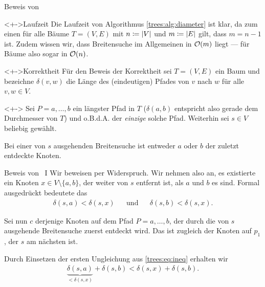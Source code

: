 \begin{frame}{Beweis von }
\begin{block}<+->{Laufzeit}
Die Laufzeit von Algorithmus \ref{trees:alg:diameter} ist klar, da zum einen f\"ur alle B\"aume $T = (V, E)$ mit $n \coloneqq \vert V\vert$ und $m \coloneqq \vert E\vert$ gilt, dass $m = n - 1$ ist.
Zudem wissen wir, dass Breitensuche im Allgemeinen in $\mathcal{O}(m)$ liegt --- f\"ur B\"aume also sogar in $\mathcal{O}(n)$.
\end{block}

\begin{block}<+->{Korrektheit}
F\"ur den Beweis der Korrektheit sei $T = (V, E)$ ein Baum und bezeichne $\delta(v, w)$ die L\"ange des (eindeutigen) Pfades von $v$ nach $w$ f\"ur alle $v, w \in V$.

\begin{lemma}<+->
\label{trees:lem:dist}
\vspace*{-7pt}
Sei $P = a, \dots, b$ ein l\"angster Pfad in $T$ ($\delta(a, b)$ entspricht also gerade dem Durchmesser von $T$) und o.B.d.A. der \emph{einzige} solche Pfad.
Weiterhin sei $s \in V$ beliebig gew\"ahlt.

Bei einer von $s$ ausgehenden Breitensuche ist entweder $a$ oder $b$ der zuletzt entdeckte Knoten.
\end{lemma}
\end{block}
\end{frame}

\begin{frame}{Beweis von  \, I}
Wir beweisen per Widerspruch.
Wir nehmen also an, es existierte ein Knoten $x \in V \setminus \{ a, b \}$, der weiter von $s$ entfernt ist, als $a$ und $b$ es sind.
Formal ausgedr\"uckt bedeutete das
\begin{align}\label{trees:eq:ineq}
    \delta(s, a) < \delta(s, x) && \text{und} && \delta(s, b) < \delta(s, x).
\end{align}

Sei nun $c$ derjenige Knoten auf dem Pfad $P = a, \dots, b$, der durch die von $s$ ausgehende Breitensuche zuerst entdeckt wird.
Das ist zugleich der Knoten auf $p_1$, der $s$ am n\"achsten ist.

Durch Einsetzen der ersten Ungleichung aus \eqref{trees:eq:ineq} erhalten wir
\begin{align}\label{trees:eq:f1}
    \underbrace{\delta(s, a)}_{< \delta(s, x)} + \delta(s, b) < \delta(s, x) + \delta(s, b).
\end{align}
\end{frame}

